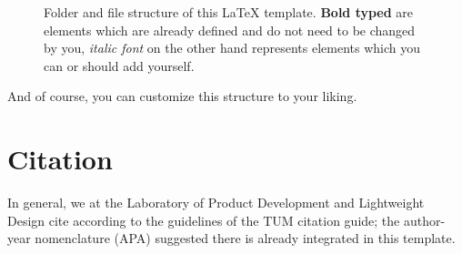 \begin{figure}[tb]
	\caption{Folder and file structure of this \LaTeX{} template. \textbf{Bold typed} are elements which are already defined and do not need to be changed by you, \emph{italic font} on the other hand represents elements which you can or should add yourself.}
	\label{fig:template_structure}	
\end{figure}

And of course, you can customize this structure to your liking.

\section{Citation}
In general, we at the Laboratory of Product Development and Lightweight Design cite according to the guidelines of the TUM citation guide; the author-year nomenclature (APA) suggested there is already integrated in this template.

